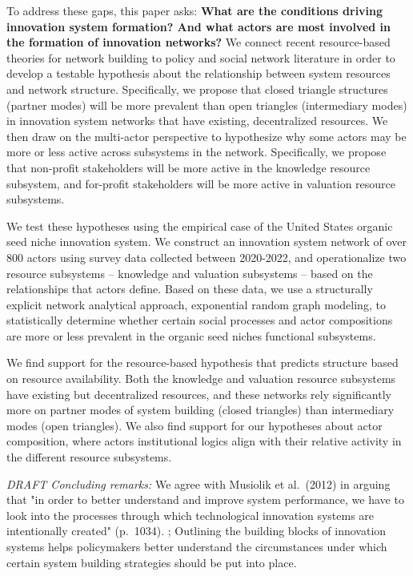 \documentclass[twoside,12pt,final]{ucthesis-CA2012}
\begin{document}
\begin{ucmainmatter}
To address these gaps, this paper asks: \textbf{What are the conditions
driving innovation system formation? And what actors are most involved
in the formation of innovation networks?} We connect recent
resource-based theories for network building to policy and social
network literature in order to develop a testable hypothesis about the
relationship between system resources and network structure.
Specifically, we propose that closed triangle structures (\textquotesingle partner
modes\textquotesingle) will be more prevalent than open triangles (\textquotesingle intermediary
modes\textquotesingle) in innovation system networks that have existing, decentralized
resources. We then draw on the multi-actor perspective to hypothesize
why some actors may be more or less active across subsystems in the
network. Specifically, we propose that non-profit stakeholders will be
more active in the knowledge resource subsystem, and for-profit
stakeholders will be more active in valuation resource subsystems.

We test these hypotheses using the empirical case of the United States
organic seed niche innovation system. We construct an innovation system
network of over 800 actors using survey data collected between
2020-2022, and operationalize two resource subsystems -- knowledge and
valuation subsystems -- based on the relationships that actors define.
Based on these data, we use a structurally explicit network analytical
approach, exponential random graph modeling, to statistically determine
whether certain social processes and actor compositions are more or less
prevalent in the organic seed niche\textquotesingle s functional subsystems.

We find support for the resource-based hypothesis that predicts
structure based on resource availability. Both the knowledge and
valuation resource subsystems have existing but decentralized resources,
and these networks rely significantly more on \textquotesingle partner modes\textquotesingle{} of
system building (closed triangles) than intermediary modes (open
triangles). We also find support for our hypotheses about actor
composition, where actors\textquotesingle{} institutional logics align with their
relative activity in the different resource subsystems.

\emph{DRAFT Concluding remarks:} We agree with Musiolik et al.~(2012) in
arguing that "in order to better understand and improve system
performance, we have to look into the processes through which
technological innovation systems are intentionally created" (p.~1034).
; Outlining the building blocks of innovation systems helps policymakers
better understand the circumstances under which certain system building
strategies should be put into place.


\end{ucmainmatter}
\end{document}
